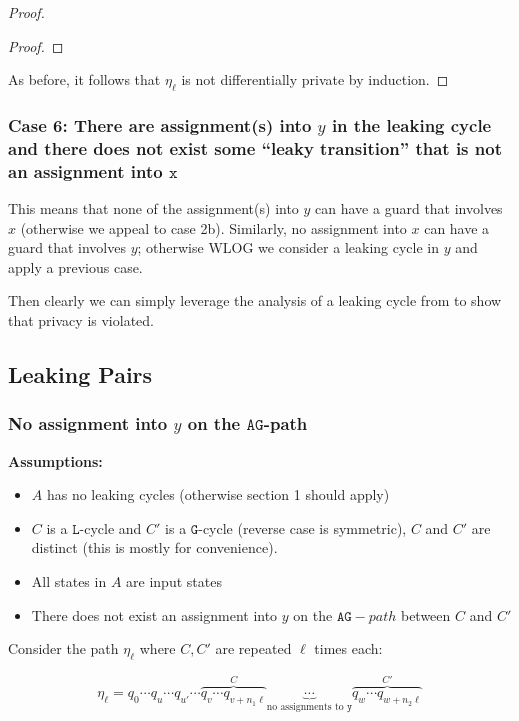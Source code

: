 \begin{proof}
\begin{proof}
	\end{proof}

	As before, it follows that $\eta_\ell$ is not differentially private by induction. 

\end{proof}

\subsubsection{Case 6: There are assignment(s) into $y$ in the leaking cycle and there does not exist some ``leaky transition'' that is not an assignment into $\texttt{x}$}

This means that none of the assignment(s) into $y$ can have a guard that involves $x$ (otherwise we appeal to case 2b). Similarly, no assignment into $x$ can have a guard that involves $y$; otherwise WLOG we consider a leaking cycle in $y$ and apply a previous case. 

Then clearly we can simply leverage the analysis of a leaking cycle from \cite{chadhaLinearTimeDecidability2021} to show that privacy is violated. 



\subsection{Leaking Pairs}

\subsubsection{No assignment into $y$ on the $\texttt{AG}$-path}

\textbf{Assumptions:}
\begin{itemize}
    \item $A$ has no leaking cycles (otherwise section 1 should apply)
    \item $C$ is a $\texttt{L}$-cycle and $C'$ is a $\texttt{G}$-cycle (reverse case is symmetric), $C$ and $C'$ are distinct (this is mostly for convenience).
    \item All states in $A$ are input states
    \item There does not exist an assignment into $y$ on the $\texttt{AG}-path$ between $C$ and $C'$
\end{itemize}


Consider the path $\eta_\ell$ where $C, C'$ are repeated $\ell$ times each:

\[\eta_{\ell} = q_0\cdots q_u \cdots q_{u'} \cdots \overbrace{q_v\cdots q_{v+n_1\ell}}^{C}\underbrace{\cdots}_{\text{no assignments to }\texttt{y}} \overbrace{q_w\cdots q_{w+n_2\ell}}^{C'}\]

